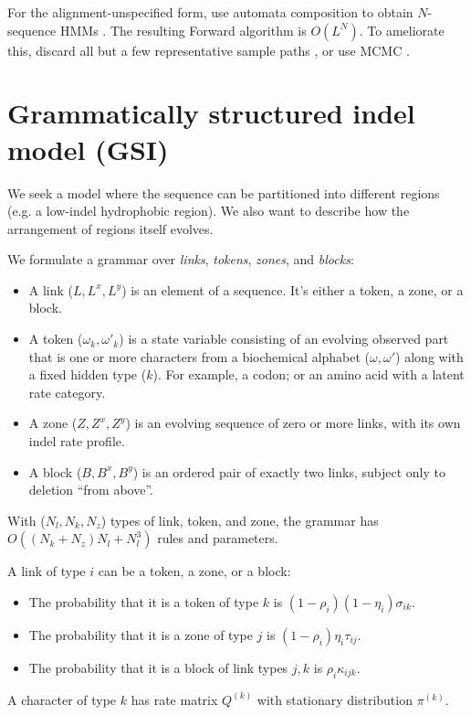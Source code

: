 \documentclass{article}
\begin{document}
For the alignment-unspecified form, use automata composition to obtain $N$-sequence HMMs \cite{SilvestreRyanEtAl2020}.
The resulting Forward algorithm is $O(L^N)$.
To ameliorate this, discard all but a few representative sample paths \cite{WestessonEtAl2012},
or use MCMC \cite{RedelingsSuchard2007}.


\section{Grammatically structured indel model (GSI)}

We seek a model where the sequence can be partitioned into different regions (e.g. a low-indel hydrophobic region).
We also want to describe how the arrangement of regions itself evolves.

We formulate a grammar over {\em links}, {\em tokens}, {\em zones}, and {\em blocks}:
\begin{itemize}
\item A link ($L,L^x,L^y$) is an element of a sequence. It's either a token, a zone, or a block.
\item A token ($\omega_k, \omega'_k$) is a state variable consisting of an evolving observed part that is one or more characters from a biochemical alphabet ($\omega, \omega'$)
  along with a fixed hidden type ($k$). For example, a codon; or an amino acid with a latent rate category.
\item A zone ($Z,Z^x,Z^y$) is an evolving sequence of zero or more links, with its own indel rate profile.
\item A block ($B,B^x,B^y$) is an ordered pair of exactly two links, subject only to deletion ``from above''.
\end{itemize}

With ($N_l,N_k,N_z$) types of link, token, and zone,
the grammar has $O((N_k + N_z) N_l + N_l^3)$ rules and parameters.

A link of type $i$ can be a token, a zone, or a block:
\begin{itemize}
\item
The probability that it is a token of type $k$ is $(1-\rho_i) (1-\eta_i) \sigma_{ik}$.
\item
The probability that it is a zone of type $j$ is $(1-\rho_i) \eta_i \tau_{ij}$.
\item
The probability that it is a block of link types $j,k$ is $\rho_i \kappa_{ijk}$.
\end{itemize}

A character of type $k$ has rate matrix $Q^{(k)}$ with stationary distribution $\pi^{(k)}$.
\end{document}
